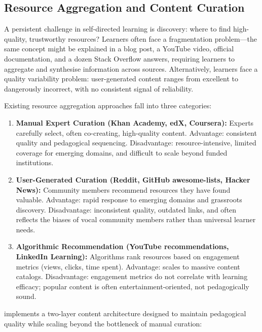 \subsection{Resource Aggregation and Content Curation}
\label{sec:resource-aggregation}

A persistent challenge in self-directed learning is discovery: where to find high-quality, trustworthy resources? Learners often face a fragmentation problem---the same concept might be explained in a blog post, a YouTube video, official documentation, and a dozen Stack Overflow answers, requiring learners to aggregate and synthesise information across sources. Alternatively, learners face a quality variability problem: user-generated content ranges from excellent to dangerously incorrect, with no consistent signal of reliability.

Existing resource aggregation approaches fall into three categories:

\begin{enumerate}
    \item \textbf{Manual Expert Curation (Khan Academy, edX, Coursera):} Experts carefully select, often co-creating, high-quality content. Advantage: consistent quality and pedagogical sequencing. Disadvantage: resource-intensive, limited coverage for emerging domains, and difficult to scale beyond funded institutions.
    \item \textbf{User-Generated Curation (Reddit, GitHub awesome-lists, Hacker News):} Community members recommend resources they have found valuable. Advantage: rapid response to emerging domains and grassroots discovery. Disadvantage: inconsistent quality, outdated links, and often reflects the biases of vocal community members rather than universal learner needs.
    \item \textbf{Algorithmic Recommendation (YouTube recommendations, LinkedIn Learning):} Algorithms rank resources based on engagement metrics (views, clicks, time spent). Advantage: scales to massive content catalogs. Disadvantage: engagement metrics do not correlate with learning efficacy; popular content is often entertainment-oriented, not pedagogically sound.
\end{enumerate}

\projectname{} implements a two-layer content architecture designed to maintain pedagogical quality while scaling beyond the bottleneck of manual curation:

